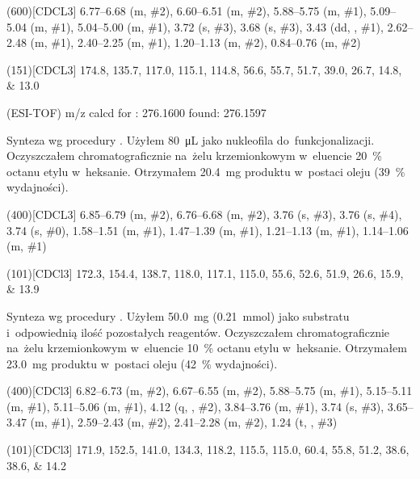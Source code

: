 \begin{fullexp}
  \NMR(600)[CDCL3] \numrange{6.77}{6.68} (m, \#{2}), \numrange{6.60}{6.51} (m, \#{2}), \numrange{5.88}{5.75} (m, \#{1}), \numrange{5.09}{5.04} (m, \#{1}), \numrange{5.04}{5.00} (m, \#{1}), \num{3.72} (s, \#{3}), \num{3.68} (s, \#{3}), \num{3.43} (dd, , \#{1}), \numrange{2.62}{2.48} (m, \#{1}), \numrange{2.40}{2.25} (m, \#{1}), \numrange{1.20}{1.13} (m, \#{2}), \numrange{0.84}{0.76} (m, \#{2})\par\noindent
  (151)[CDCL3] \numlist{174.8; 135.7; 117.0; 115.1; 114.8; 56.6; 55.7; 51.7; 39.0; 26.7; 14.8; 13.0}\par\noindent
   (ESI-TOF) m/z calcd for : \num{276.1600} found: \num{276.1597}
\end{fullexp}

Synteza wg procedury .
Użyłem \SI{80}{\uL}  jako nukleofila do~funkcjonalizacji.
Oczyszczałem chromatograficznie na~żelu krzemionkowym w~eluencie \SI{20}{\percent} octanu
  etylu w~heksanie.
Otrzymałem \SI{20.4}{\mg} produktu w~postaci oleju (\SI{39}{\percent} wydajności).
\begin{fullexp}
  \NMR(400)[CDCL3] \numrange{6.85}{6.79} (m, \#{2}), \numrange{6.76}{6.68} (m, \#{2}), \num{3.76} (s, \#{3}), \num{3.76} (s, \#{4}), \num{3.74} (s, \#{0}), \numrange{1.58}{1.51} (m, \#{1}), \numrange{1.47}{1.39} (m, \#{1}), \numrange{1.21}{1.13} (m, \#{1}), \numrange{1.14}{1.06} (m, \#{1})\par\noindent
  (101)[CDCl3] \numlist{172.3; 154.4; 138.7; 118.0; 117.1; 115.0; 55.6; 52.6; 51.9; 26.6; 15.9; 13.9}
\end{fullexp}

Synteza wg procedury .
Użyłem \SI{50.0}{\mg} (\SI{0.21}{\milli\mole})  jako substratu
  i~odpowiednią ilość pozostałych reagentów.
Oczyszczałem chromatograficznie na~żelu krzemionkowym w~eluencie \SI{10}{\percent} octanu
  etylu w~heksanie.
Otrzymałem \SI{23.0}{\mg} produktu w~postaci oleju (\SI{42}{\percent} wydajności).

\begin{fullexp}
  \NMR(400)[CDCl3] \numrange{6.82}{6.73} (m, \#{2}), \numrange{6.67}{6.55} (m, \#{2}), \numrange{5.88}{5.75} (m, \#{1}), \numrange{5.15}{5.11} (m, \#{1}), \numrange{5.11}{5.06} (m, \#{1}), \num{4.12} (q, , \#{2}), \numrange{3.84}{3.76} (m, \#{1}), \num{3.74} (s, \#{3}), \numrange{3.65}{3.47} (m, \#{1}), \numrange{2.59}{2.43} (m, \#{2}), \numrange{2.41}{2.28} (m, \#{2}), \num{1.24} (t, , \#{3})\par\noindent
  (101)[CDCl3] \numlist{171.9; 152.5; 141.0; 134.3; 118.2; 115.5; 115.0; 60.4; 55.8; 51.2; 38.6; 38.6; 14.2}
\end{fullexp}


